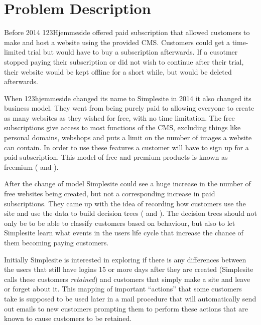 \section{Problem Description}

Before 2014 123Hjemmeside offered paid subscription that allowed customers to
make and host a website using the provided CMS. Customers could get a time-
limited trial but would have to buy a subscription afterwards. If a cusotmer
stopped paying their subscription or did not wish to continue after their trial,
their website would be kept offline for a short while, but would be deleted
afterwards.

When 123hjemmeside changed its name to Simplesite in 2014 it also changed its
business model. They went from being purely paid to allowing everyone to create
as many websites as they wished for free, with no time limitation. The free
subscriptions give access to most functions of the CMS, excluding things like
personal domains, webshops and puts a limit on the number of images a website
can contain. In order to use these features a customer will have to sign up for
a paid subscription. This model of free and premium products is known as
freemium (\cite[p. 6]{bekkelund2011succeeding} and
\cite[p. 1]{pujol2010freemium}).

After the change of model Simplesite could see a huge increase in the number of
free websites being created, but not a corresponding increase in paid
subscriptions. They came up with the idea of recording how customers use the
site and use the data to build decision trees (\cite{breiman1984classification}
and \cite{quinlan1986induction}). The decision trees should not only be to be
able to classify customers based on behaviour, but also to let Simplesite learn
what events in the users life cycle that increase the chance of them becoming
paying customers.

Initially Simplesite is interested in exploring if there is any differences
between the users that still have logins 15 or more days after they are created
(Simplesite calls these customers \textit{retained}) and customers that simply
make a site and leave or forget about it. This mapping of important ``actions''
that some customers take is supposed to be used later in a mail procedure that
will automatically send out emails to new customers prompting them to perform
these actions that are known to cause customers to be retained.


